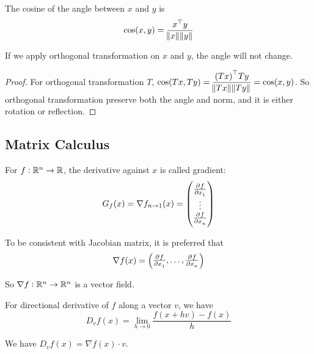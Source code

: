 \begin{theorem}
    The cosine of the angle between $x$ and $y$ is
    \begin{equation}
        \cos(x,y) = \frac{{x}^\top y}{\norm{x} \norm{y}}
    \end{equation}
    
    If we apply orthogonal transformation on $x$ and $y$, the angle will not change.
\end{theorem}
\begin{proof}
    For orthogonal transformation $T$, $\displaystyle \cos(Tx, Ty) = \frac{{(Tx)}^\top Ty}{\norm{Tx} \norm{Ty}} = \cos(x,y)$. So orthogonal transformation preserve both the angle and norm, and it is either rotation or reflection.
\end{proof}


\subsection{Matrix Calculus}

\begin{definition}[Gradient]
    For $f: \mathbb{R}^n \rightarrow \mathbb{R}$, the derivative against $x$ is called gradient:
    \begin{equation}
    G_f (x) = \nabla f_{n \rightarrow 1} (x) = \begin{pmatrix}
        \pd{f}{x_1} \\
        \vdots \\
        \pd{f}{x_n}
    \end{pmatrix}
    \end{equation}
    
    To be consistent with Jacobian matrix, it is preferred that
    \begin{equation}
        \nabla f (x) = \begin{pmatrix}
            \pd{f}{x_1}, \hdots, \pd{f}{x_n}
        \end{pmatrix}
    \end{equation}
    
    So $\nabla f: \mathbb{R}^n \rightarrow \mathbb{R}^n$ is a vector field.
\end{definition}



\begin{example}    
For directional derivative of $f$ along a vector $v$, we have 
\begin{equation}
    D_v f(x) = \lim\limits_{h \rightarrow 0} \frac{f(x + hv) - f(x)}{h}
\end{equation}

We have $D_v f(x) = \nabla f(x) \cdot v$.
\end{example}

